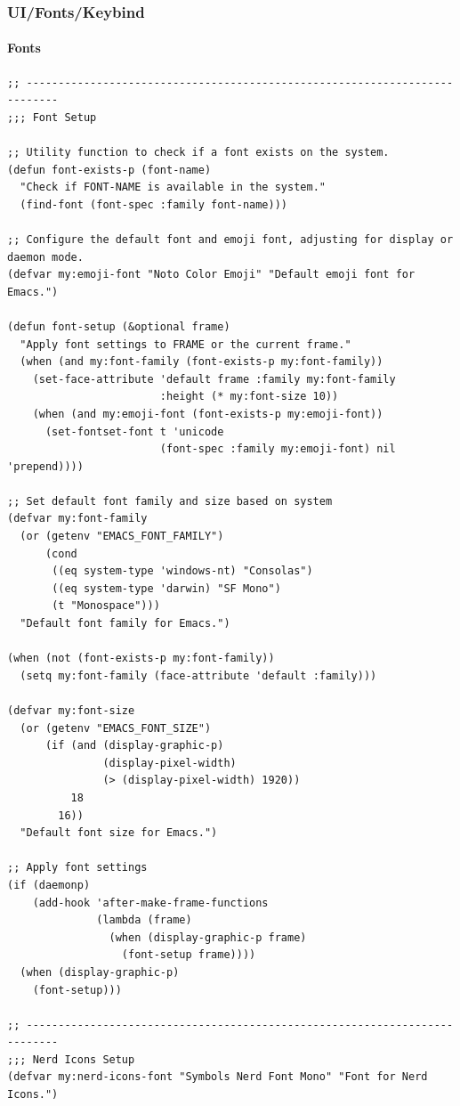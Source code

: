 \documentclass[11pt]{article}
\begin{document}
\subsubsection{UI/Fonts/Keybind}
\label{sec:org20455ef}
\paragraph{Fonts}
\label{sec:org8917194}

\begin{verbatim}
;; ---------------------------------------------------------------------------
;;; Font Setup

;; Utility function to check if a font exists on the system.
(defun font-exists-p (font-name)
  "Check if FONT-NAME is available in the system."
  (find-font (font-spec :family font-name)))

;; Configure the default font and emoji font, adjusting for display or daemon mode.
(defvar my:emoji-font "Noto Color Emoji" "Default emoji font for Emacs.")

(defun font-setup (&optional frame)
  "Apply font settings to FRAME or the current frame."
  (when (and my:font-family (font-exists-p my:font-family))
    (set-face-attribute 'default frame :family my:font-family
                        :height (* my:font-size 10))
    (when (and my:emoji-font (font-exists-p my:emoji-font))
      (set-fontset-font t 'unicode
                        (font-spec :family my:emoji-font) nil 'prepend))))

;; Set default font family and size based on system
(defvar my:font-family
  (or (getenv "EMACS_FONT_FAMILY")
      (cond
       ((eq system-type 'windows-nt) "Consolas")
       ((eq system-type 'darwin) "SF Mono")
       (t "Monospace")))
  "Default font family for Emacs.")

(when (not (font-exists-p my:font-family))
  (setq my:font-family (face-attribute 'default :family)))

(defvar my:font-size
  (or (getenv "EMACS_FONT_SIZE")
      (if (and (display-graphic-p)
               (display-pixel-width)
               (> (display-pixel-width) 1920))
          18
        16))
  "Default font size for Emacs.")

;; Apply font settings
(if (daemonp)
    (add-hook 'after-make-frame-functions
              (lambda (frame)
                (when (display-graphic-p frame)
                  (font-setup frame))))
  (when (display-graphic-p)
    (font-setup)))

;; ---------------------------------------------------------------------------
;;; Nerd Icons Setup
(defvar my:nerd-icons-font "Symbols Nerd Font Mono" "Font for Nerd Icons.")


\end{verbatim}
\end{document}
